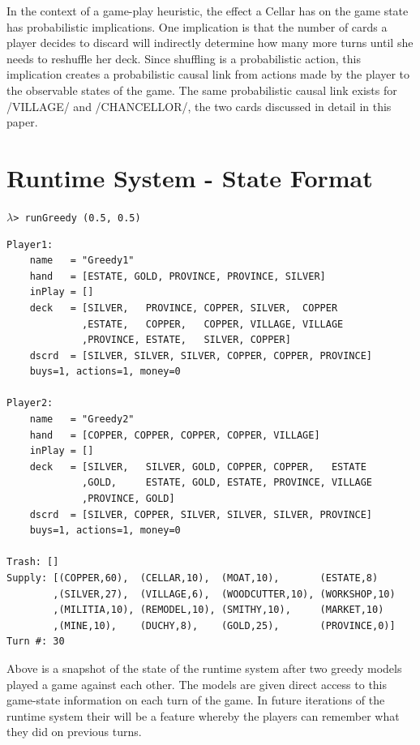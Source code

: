 In the context of a game-play heuristic, the effect a Cellar has on the game state
has probabilistic implications. One implication is that the number of cards a
player decides to discard will indirectly determine how many more turns until
she needs to reshuffle her deck. Since shuffling is a probabilistic action, this
implication creates a probabilistic causal link from actions made by the player
to the observable states of the game.
The same probabilistic causal link exists for \hsk/VILLAGE/ and \hsk/CHANCELLOR/,
the two cards discussed in detail in this paper.

\newpage

\section{Runtime System - State Format} \label{appendix:dominion-state-format}
\begin{small}
$\lambda$\verb|> runGreedy (0.5, 0.5)|
\end{small}
\begin{Verbatim}[fontsize=\small]
Player1:
    name   = "Greedy1"
    hand   = [ESTATE, GOLD, PROVINCE, PROVINCE, SILVER]
    inPlay = []
    deck   = [SILVER,   PROVINCE, COPPER, SILVER,  COPPER
             ,ESTATE,   COPPER,   COPPER, VILLAGE, VILLAGE
             ,PROVINCE, ESTATE,   SILVER, COPPER]
    dscrd  = [SILVER, SILVER, SILVER, COPPER, COPPER, PROVINCE]
    buys=1, actions=1, money=0

Player2:
    name   = "Greedy2"
    hand   = [COPPER, COPPER, COPPER, COPPER, VILLAGE]
    inPlay = []
    deck   = [SILVER,   SILVER, GOLD, COPPER, COPPER,   ESTATE
             ,GOLD,     ESTATE, GOLD, ESTATE, PROVINCE, VILLAGE
             ,PROVINCE, GOLD]
    dscrd  = [SILVER, COPPER, SILVER, SILVER, SILVER, PROVINCE]
    buys=1, actions=1, money=0

Trash: []
Supply: [(COPPER,60),  (CELLAR,10),  (MOAT,10),       (ESTATE,8)
        ,(SILVER,27),  (VILLAGE,6),  (WOODCUTTER,10), (WORKSHOP,10)
        ,(MILITIA,10), (REMODEL,10), (SMITHY,10),     (MARKET,10)
        ,(MINE,10),    (DUCHY,8),    (GOLD,25),       (PROVINCE,0)]
Turn #: 30
\end{Verbatim}

Above is a snapshot of the state of the runtime system after two
greedy models played a game against each other.
The models are given direct access to this game-state information
on each turn of the game. In future iterations of the runtime system
their will be a feature whereby the players can remember what
they did on previous turns.

